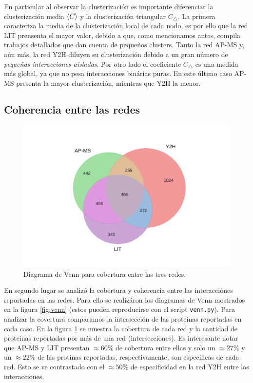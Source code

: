 En particular al observar la clusterizaci\'on es importante diferenciar la clusterizaci\'on media $\left\langle C\right\rangle$ y la 
clusterizaci\'on triangular $C_\bigtriangleup$. La primera caracteriza la media de la clusterizaci\'on local de cada 
nodo, es por ello que la red LIT prensenta el mayor valor, debido a que, como mencionamos antes, compila
trabajos detallados que dan cuenta de peque\~nos clusters. Tanto la red AP-MS y, a\'un m\'as, la red Y2H diluyen
su clusterizaci\'on debido a un gran n\'umero de \textit{peque\~nas interacciones aisladas}. Por otro lado
el coeficiente $C_\bigtriangleup$ es una medida m\'as global, ya que no pesa interacciones bin\'arias puras.
En este \'ultimo caso AP-MS presenta la mayor clusterizaci\'on, mientras que Y2H la menor.


\subsection{Coherencia entre las redes}

\begin{figure}[!ht]
    \centering
    \includegraphics[width=.5\columnwidth]{./schemes/venn_AP-MS-Y2H-LIT_covertura.pdf}
    \caption{\label{fig:cober} Diagrama de Venn para cobertura entre las tres redes. }
\end{figure}



En segundo lugar se analiz\'o la cobertura y coherencia entre las interacci\'ones reportadas
en las redes. Para ello se realiz\'aron los diagramas de Venn mostrados en la figura \ref{fig:venn} 
(estos pueden reproducirse con el script \texttt{venn.py}). Para analizar la covertura comparamos
la intersecci\'on de las prote\'inas reportadas en cada caso. En la figura \ref{fig:cober} se muestra
la cobertura de cada red y la cantidad de proteinas reportadas por m\'as de una red (intersecciones). Es 
interesante notar que AP-MS y LIT presentan $\approx 60\%$ de cobertura entre ellas y solo un $\approx 27\%$ 
y un $\approx 22\%$ de las prot\'inas reportadas, respectivamente, son especificas de cada red. Esto se ve contrastado
con el $\approx 50\%$ de especificidad en la red Y2H entre las interacciones. 


